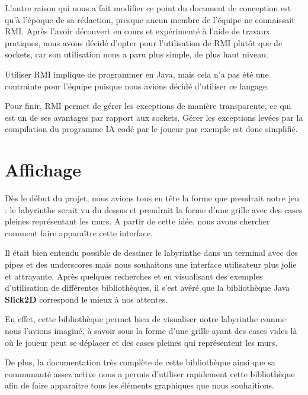 	L'autre raison qui nous a fait modifier ce point du document de conception est qu'à l'époque de sa rédaction, presque aucun membre de l'équipe ne connaissait RMI. Après l'avoir découvert en cours et expérimenté à l'aide de travaux pratiques, nous avons décidé d'opter pour l'utilisation de RMI plutôt que de sockets, car son utilisation nous a paru plus simple, de plus haut niveau.

	Utiliser RMI implique de programmer en Java, mais cela n'a pas été une contrainte pour l'équipe puisque nous avions décidé d'utiliser ce langage.

	Pour finir, RMI permet de gérer les exceptions de manière transparente, ce qui est un de ses avantages par rapport aux sockets. Gérer les exceptions levées par la compilation du programme IA codé par le joueur par exemple est donc simplifié.

\section{Affichage}
	Dès le début du projet, nous avions tous en tête la forme que prendrait notre jeu : le labyrinthe serait vu du dessus et prendrait la forme d'une grille avec des cases pleines représentant les murs. A partir de cette idée, nous avons chercher comment faire apparaître cette interface.

	Il était bien entendu possible de dessiner le labyrinthe dans un terminal avec des pipes et des underscores mais nous souhaitons une interface utilisateur plus jolie et attrayante. Après quelques recherches et en visualisant des exemples d'utilisation de différentes bibliothèques, il s'est avéré que la bibliothèque Java \textbf{Slick2D} correspond le mieux à nos attentes.

    En effet, cette bibliothèque permet bien de visualiser notre labyrinthe comme nous l'avions imaginé, à savoir sous la forme d'une grille ayant des cases vides là où le joueur peut se déplacer et des cases pleines qui représentent les murs.

    De plus, la documentation très complète de cette bibliothèque ainsi que sa communauté assez active nous a permis d'utiliser rapidement cette bibliothèque afin de faire apparaître tous les éléments graphiques que nous souhaitions.
